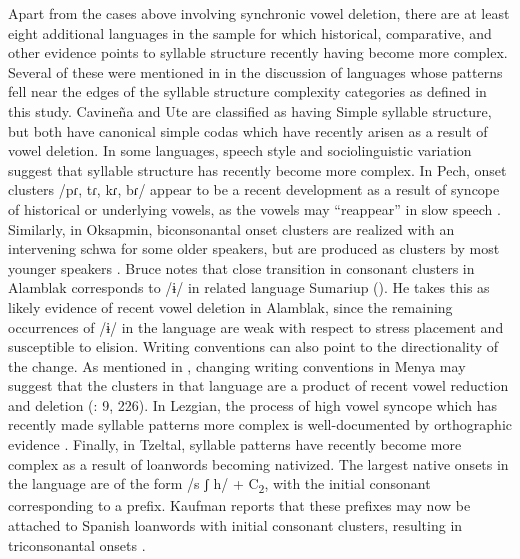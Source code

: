   Apart from the cases above involving synchronic vowel deletion, there are at least eight additional languages in the sample for which historical, comparative, and other evidence points to syllable structure recently having become more complex. Several of these were mentioned in  in the discussion of languages whose patterns fell near the edges of the syllable structure complexity categories as defined in this study. Cavineña and Ute are classified as having Simple syllable structure, but both have canonical simple codas which have recently arisen as a result of vowel deletion. In some languages, speech style and sociolinguistic variation suggest that syllable structure has recently become more complex. In Pech, onset clusters /pɾ, tɾ, kɾ, bɾ/ appear to be a recent development as a result of syncope of historical or underlying vowels, as the vowels may “reappear” in slow speech \citep[20]{Holt1999}. Similarly, in Oksapmin, biconsonantal onset clusters are realized with an intervening schwa for some older speakers, but are produced as clusters by most younger speakers \citep[65-67]{Loughnane2009}. Bruce notes that close transition in consonant clusters in Alamblak corresponds to /ɨ/ in related language Sumariup (\citeyear[69--70]{Bruce1984}). He takes this as likely evidence of recent vowel deletion in Alamblak, since the remaining occurrences of /ɨ/ in the language are weak with respect to stress placement and susceptible to elision. Writing conventions can also point to the directionality of the change. As mentioned in , changing writing conventions in Menya may suggest that the clusters in that language are a product of recent vowel reduction and deletion (\citealt{Whitehead2004}: 9, 226). In Lezgian, the process of high vowel syncope which has recently made syllable patterns more complex is well-documented by orthographic evidence \citep[36-8]{Haspelmath1993}. Finally, in Tzeltal, syllable patterns have recently become more complex as a result of loanwords becoming nativized. The largest native onsets in the language are of the form /s ʃ h/ + C\textsubscript{2}, with the initial consonant corresponding to a prefix. Kaufman reports that these prefixes may now be attached to Spanish loanwords with initial consonant clusters, resulting in triconsonantal onsets \citep[14]{Kaufman1971}.

